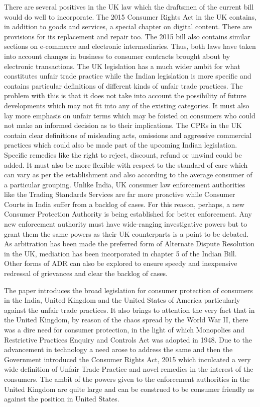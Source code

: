 \begin{multicols}{2}
\noi
There are several positives in the UK law which the draftsmen of the current bill would do well
to incorporate. The 2015 Consumer Rights Act in the UK contains, in addition to goods and
services, a special chapter on digital content. There are provisions for its replacement and repair
too. The 2015 bill also contains similar sections on e-commerce and electronic intermediaries.
Thus, both laws have taken into account changes in business to consumer contracts brought
about by electronic transactions. The UK legislation has a much wider ambit for what
constitutes unfair trade practice while the Indian legislation is more specific and contains
particular definitions of different kinds of unfair trade practices. The problem with this is that
it does not take into account the possibility of future developments which may not fit into any
of the existing categories. It must also lay more emphasis on unfair terms which may be foisted
on consumers who could not make an informed decision as to their implications. The CPRs in
the UK contain clear definitions of misleading acts, omissions and aggressive commercial
practices which could also be made part of the upcoming Indian legislation. Specific remedies 
like the right to reject, discount, refund or unwind could be added. It must also be more flexible
with respect to the standard of care which can vary as per the establishment and also according
to the average consumer of a particular grouping. Unlike India, UK consumer law enforcement
authorities like the Trading Standards Services are far more proactive while Consumer Courts
in India suffer from a backlog of cases. For this reason, perhaps, a new Consumer Protection
Authority is being established for better enforcement. Any new enforcement authority must
have wide-ranging investigative powers but to grant them the same powers as their UK
counterparts is a point to be debated. As arbitration has been made the preferred form of
Alternate Dispute Resolution in the UK, mediation has been incorporated in chapter 5 of the
Indian Bill. Other forms of ADR can also be explored to ensure speedy and inexpensive
redressal of grievances and clear the backlog of cases.


\noi
The paper introduces the broad legislation for consumer protection of consumers in the India,
United Kingdom and the United States of America particularly against the unfair trade
practices. It also brings to attention the very fact that in the United Kingdom, by reason of the
chaos spread by the World War II, there was a dire need for consumer protection, in the light
of which Monopolies and Restrictive Practices Enquiry and Controls Act was adopted in 1948.
Due to the advancement in technology a need arose to address the same and then the
Government introduced the Consumer Rights Act, 2015 which inculcated a very wide
definition of Unfair Trade Practice and novel remedies in the interest of the consumers. The
ambit of the powers given to the enforcement authorities in the United Kingdom are quite large
and can be construed to be consumer friendly as against the position in United States.


\end{multicols}
